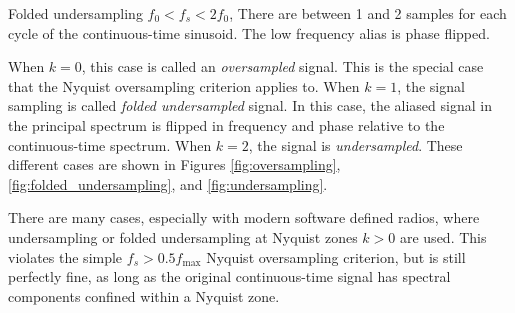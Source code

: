 \begin{marginfigure}
\begin{center}
\end{center}
\caption{Folded undersampling $f_{0} < f_s < 2 f_0$, There are between 1 and 2 samples for each cycle of the continuous-time sinusoid. The low frequency alias is phase flipped.}
\label{fig:folded_undersampling}
\end{marginfigure}

When $k=0$, this case is called an \emph{oversampled} signal. This is the special case that the Nyquist oversampling criterion applies to. When $k = 1$, the signal sampling is called \emph{folded undersampled} signal. In this case, the aliased signal in the principal spectrum is flipped in frequency and phase relative to the continuous-time spectrum. When $k=2$, the signal is \emph{undersampled}. These different cases are shown in Figures \ref{fig:oversampling}, \ref{fig:folded_undersampling}, and \ref{fig:undersampling}.

There are many cases, especially with modern software defined radios, where undersampling or folded undersampling at Nyquist zones $k>0$ are used. This violates the simple $f_s > 0.5 f_{\mathrm{max}}$ Nyquist oversampling criterion, but is still perfectly fine, as long as the original continuous-time signal has spectral components confined within a Nyquist zone.


